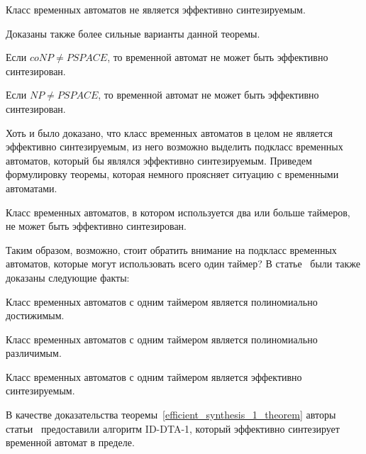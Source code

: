 \documentclass[times,specification,annotation]{itmo-student-thesis}
\begin{document}
\begin{theorem}
  Класс временных автоматов не является эффективно синтезируемым.
  \label{efficient_synthesis_theorem}
\end{theorem}

Доказаны также более сильные варианты данной теоремы.

\begin{theorem}
  Если $coNP \neq PSPACE$, то временной автомат не может быть эффективно синтезирован.
  \label{coNPneqPSPACE_lemma}
\end{theorem}

\begin{theorem}
  Если $NP \neq PSPACE$, то временной автомат не может быть эффективно синтезирован.
  \label{NPneqPSPACE_lemma}
\end{theorem}

Хоть и было доказано, что класс временных автоматов в целом не является эффективно синтезируемым, из него возможно выделить подкласс временных автоматов, 
который бы являлся эффективно синтезируемым. Приведем формулировку теоремы, которая немного проясняет ситуацию с временными автоматами.

\begin{theorem}
  Класс временных автоматов, в котором используется два или больше таймеров, не может быть эффективно синтезирован.
  \label{two_or_more_timers_lemma}
\end{theorem}

Таким образом, возможно, стоит обратить внимание на подкласс временных автоматов, которые могут использовать всего один таймер? 
В статье~\cite{1-dta} были также доказаны следующие факты:

\begin{lemma}
  Класс временных автоматов с одним таймером является полиномиально достижимым.
  \label{reachability_1_lemma}
\end{lemma}

\begin{lemma}
  Класс временных автоматов с одним таймером является полиномиально различимым.
  \label{distinguishability_1_lemma}
\end{lemma}

\begin{theorem}
  Класс временных автоматов с одним таймером является эффективно синтезируемым.
  \label{efficient_synthesis_1_theorem}
\end{theorem}

В качестве доказательства теоремы~\ref{efficient_synthesis_1_theorem} авторы статьи~\cite{1-dta} предоставили алгоритм ID-DTA-1, который эффективно синтезирует временной автомат в пределе.
\end{document}
